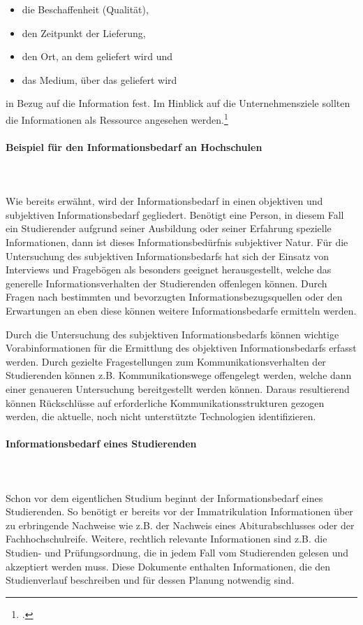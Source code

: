 \begin{itemize}
	\item die Beschaffenheit (Qualität),
	\item den Zeitpunkt der Lieferung,
	\item den Ort, an dem geliefert wird und
	\item das Medium, über das geliefert wird		 
\end{itemize}
in Bezug auf die Information fest. Im Hinblick auf die Unternehmensziele sollten die Informationen als Ressource angesehen werden.\footcite[Vgl. u.a.][]{bode_informationsbegriff_1997}

\paragraph*{Beispiel für den Informationsbedarf an Hochschulen}\mbox{}\\\\
Wie bereits erwähnt, wird der Informationsbedarf in einen objektiven und subjektiven Informationsbedarf gegliedert. Benötigt eine Person, in diesem Fall ein Studierender aufgrund seiner Ausbildung oder seiner Erfahrung spezielle Informationen, dann ist dieses Informationsbedürfnis subjektiver Natur. 
Für die Untersuchung des subjektiven Informationsbedarfs hat sich der Einsatz von Interviews und Fragebögen als besonders geeignet herausgestellt, welche das generelle Informationsverhalten der Studierenden offenlegen können. Durch Fragen nach bestimmten und bevorzugten Informationsbezugsquellen oder den Erwartungen an eben diese können weitere Informationsbedarfe ermitteln werden.

Durch die Untersuchung des subjektiven Informationsbedarfs können wichtige Vorabinformationen für die Ermittlung des objektiven Informationsbedarfs erfasst werden. Durch gezielte Fragestellungen zum Kommunikationsverhalten der Studierenden können z.B. Kommunikationswege offengelegt werden, welche dann einer genaueren Untersuchung bereitgestellt werden können. Daraus resultierend können Rückschlüsse auf erforderliche Kommunikationsstrukturen gezogen werden, die aktuelle, noch nicht unterstützte Technologien identifizieren. 

\paragraph*{Informationsbedarf eines Studierenden}\mbox{}\\\\
Schon vor dem eigentlichen Studium beginnt der Informationsbedarf  eines Studierenden. So benötigt er bereits vor der Immatrikulation Informationen über zu erbringende Nachweise wie z.B. der Nachweis eines Abiturabschlusses oder der Fachhochschulreife. Weitere, rechtlich relevante Informationen sind z.B. die Studien- und Prüfungsordnung, die in jedem Fall vom Studierenden gelesen und akzeptiert werden muss. Diese Dokumente enthalten Informationen, die den Studienverlauf beschreiben und für dessen Planung notwendig sind.

